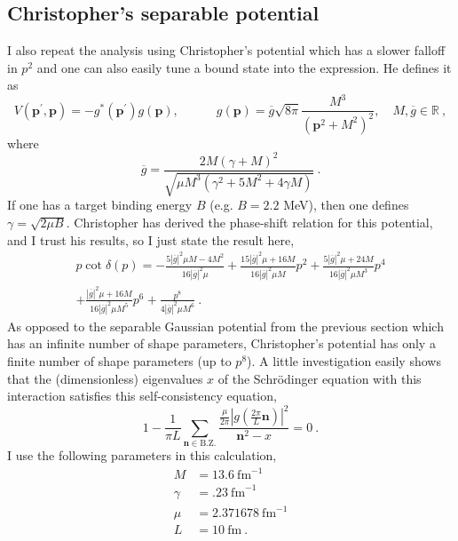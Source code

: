 \documentclass[11pt]{article}
\begin{document}
\subsection{Christopher's separable potential}
I also repeat the analysis using Christopher's potential which has a slower falloff in $p^2$ and one can also easily tune a bound state into the expression.  He defines it as
\begin{equation}\label{eqn:koerber potential}
V\left(\boldsymbol{p}^{\prime}, \boldsymbol{p}\right)=-g^{*}\left(\boldsymbol{p}^{\prime}\right) g(\boldsymbol{p}), \quad \quad \quad g(\boldsymbol{p})=\overline{g} \sqrt{8 \pi} \frac{M^{3}}{\left(\boldsymbol{p}^{2}+M^{2}\right)^{2}}, \quad M, \overline{g} \in \mathbb{R}\ ,
\end{equation}
where
\begin{equation}
\overline{g}=\frac{2 M(\gamma+M)^{2}}{\sqrt{\mu M^{3}\left(\gamma^{2}+5 M^{2}+4 \gamma M\right)}}\ .
\end{equation}
If one has a target binding energy $B$ (e.g. $B=2.2$ MeV), then one defines $\gamma=\sqrt{2\mu B}$.  Christopher has derived the phase-shift relation for this potential, and I trust his results, so I just state the result here,
\begin{multline}
p\cot\delta(p) = -\frac{5|\overline{g}|^{2} \mu M-4 M^{2}}{16|\overline{g}|^{2} \mu}+\frac{15|\overline{g}|^{2} \mu+16 M}{16|\overline{g}|^{2} \mu M} p^{2}+\frac{5|\overline{g}|^{2} \mu+24 M}{16|\overline{g}|^{2} \mu M^{3}} p^{4}\\
+\frac{|\overline{g}|^{2} \mu+16 M}{16|\overline{g}|^{2} \mu M^{5}} p^{6}+\frac{ p^{8}}{4|\overline{g}|^{2} \mu M^{6}}\ .
\end{multline}
As opposed to the separable Gaussian potential from the previous section which has an infinite number of shape parameters, Christopher's potential has only a finite number of shape parameters (up to $p^8$).  A little investigation easily shows that the (dimensionless) eigenvalues $x$ of the Schr\"odinger equation with this interaction satisfies this self-consistency equation,
\begin{equation}
1-\frac{1}{\pi L}\sum_{\bm n\in\mathrm{B.Z.}}\frac{\frac{\mu}{2\pi}\left|g\left(\frac{2\pi}{L}\bm n\right)\right|^2}{\bm n^2-x}=0\ .
\end{equation}
I use the following parameters in this calculation,
\begin{align*}
M&=13.6\ \mathrm{ fm}^{-1}\\
\gamma&=.23\ \mathrm{ fm}^{-1}\\
\mu&=2.371678\ \mathrm{ fm}^{-1}\\
L&=10\ \mathrm{ fm}\ .
\end{align*}
\end{document}
